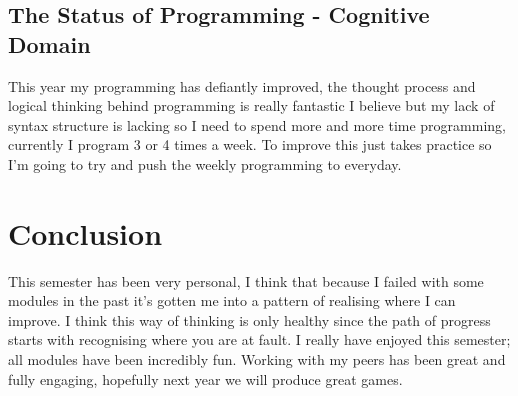 \documentclass[10pt,a4paper]{report}
\begin{document}
	\subsection*{The Status of Programming - Cognitive Domain}
	This year my programming has defiantly improved, the thought process and logical thinking behind programming is really fantastic I believe but my lack of syntax structure is lacking so I need to spend more and more time programming, currently I program 3 or 4 times a week. To improve this just takes practice so I'm going to try and push the weekly programming to everyday.
	
	\section*{Conclusion}
	This semester has been very personal, I think that because I failed with some modules in the past it's gotten me into a pattern of realising where I can improve. I think this way of thinking is only healthy since the path of progress starts with recognising where you are at fault. I really have enjoyed this semester; all modules have been incredibly fun. Working with my peers has been great and fully engaging, hopefully next year we will produce great games.
	
\end{document}
